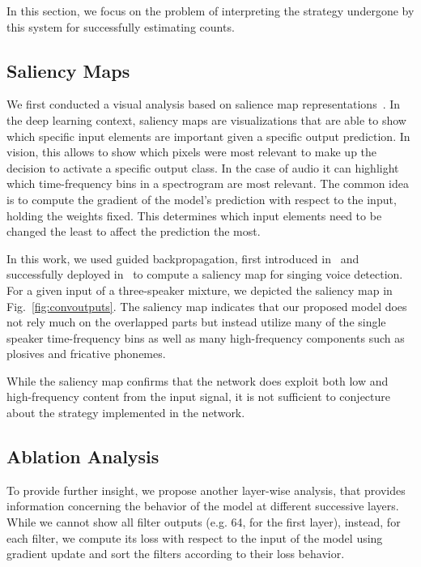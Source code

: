In this section, we focus on the problem of interpreting the strategy undergone by this system for successfully estimating counts.

\subsection{Saliency Maps}
We first conducted a visual analysis based on salience map representations~\cite{simonyan13}.
In the deep learning context, saliency maps are visualizations that are able to show which specific input elements are important given a specific output prediction. In vision, this allows to show which pixels were most relevant to make up the decision to activate a specific output class. 
In the case of audio it can highlight which time-frequency bins in a spectrogram are most relevant.
The common idea is to compute the gradient of the model's prediction with respect to the input, holding the weights fixed. This determines which input elements need to be changed the least to affect the prediction the most.
\par
In this work, we used guided backpropagation, first introduced in~\cite{Springenberg14} and successfully deployed in~\cite{schluter16} to compute a saliency map for singing voice detection.
For a given input of a three-speaker mixture, we depicted the saliency map in Fig.~\ref{fig:convoutputs}.
The saliency map indicates that our proposed model does not rely much on the overlapped parts but instead utilize many of the single speaker time-frequency bins as well as many high-frequency components such as plosives and fricative phonemes.\par
While the saliency map confirms that the network does exploit both low and high-frequency content from the input signal, it is not sufficient to conjecture about the strategy implemented in the network.

\subsection{Ablation Analysis}
To provide further insight, we propose another layer-wise analysis, that provides information concerning the behavior of the model at different successive layers.
While we cannot show all filter outputs (e.g. 64, for the first layer), instead, for each filter, we compute its loss with respect to the input of the model using gradient update and sort the filters according to their loss behavior.\par

